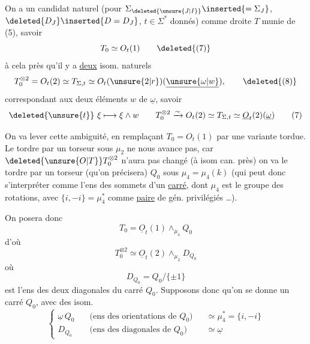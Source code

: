 On a un candidat naturel (pour $\Sigma_{\deleted{\unsure{J|I}}}\inserted{=\Sigma_J}$, $\deleted{D_J}\inserted{D=D_J}$, $t\in\Sigma^\ast$ donnés) comme droite $T$ munie de (5), savoir
\[
T_0\simeq O_t(1) \tag*{\deleted{(7)}}
\]
à cela près qu'il y a \uline{deux} isom. naturels
\[
T_0^{\otimes2}=O_t(2)\simeq T_{\Sigma,t}\simeq O_t(\unsure{2|r})(\underline{\unsure{\omega|w}}),\tag*{\deleted{(8)}}
\]
correspondant aux deux éléments $w$ de $\underline\omega$, savoir
\[
\deleted{\unsure{t}}\ \xi\longmapsto\xi\wedge w \qquad
T_0^{\otimes2}\xrightarrow{\sim}O_t(2)\simeq T_{\Sigma,t}\simeq\underline O_t(2)(\underline\omega) \tag*{(7)}
\]

On va lever cette ambiguité, en remplaçant $T_0=O_t(1)$ par une variante tordue. Le tordre par un torseur sous $\mu_2$  ne nous avance pas, car $\deleted{\unsure{O|T}}T_0^{\otimes2}$ n'aura pas changé (à isom can. près) on va le tordre par un torseur (qu'on précisera) $Q_0$ sous $\mu_4=\mu_4(k)$ (qui peut donc s'interpréter comme l'ens des sommets d'un \uline{carré}, dont $\mu_4$ est le groupe des rotations, avec $\{i,-i\}=\mu_4^\ast$ comme \uline{paire} de gén. privilégiés \ldots).

On posera donc
\[
T_0=\underline O_t(1)\wedge_{\mu_4}Q_0 \tag*{(8)}
\]
d'où
\[
T_0^{\otimes2}\simeq\underline O_t(2)\wedge_{\mu_2}D_{Q_0} \tag*{(9)}
\]
où
\[
D_{Q_0}=Q_0/\{\pm1\} \tag*{(10)}
\]
est l'ens des deux diagonales du carré $Q_0$. Supposons donc qu'on se donne un carré  $Q_0$, avec des isom. 
\[
\left\{\begin{aligned}
\underline\omega\,Q_0\quad &\text{(ens des orientations de $Q_0$)} &&\simeq\mu_4^\ast=\{i,-i\}\\
D_{Q_0}\quad &\text{(ens des diagonales de $Q_0$)} &&\simeq\underline\omega
\end{aligned}\right. \tag*{(11)}
\]
